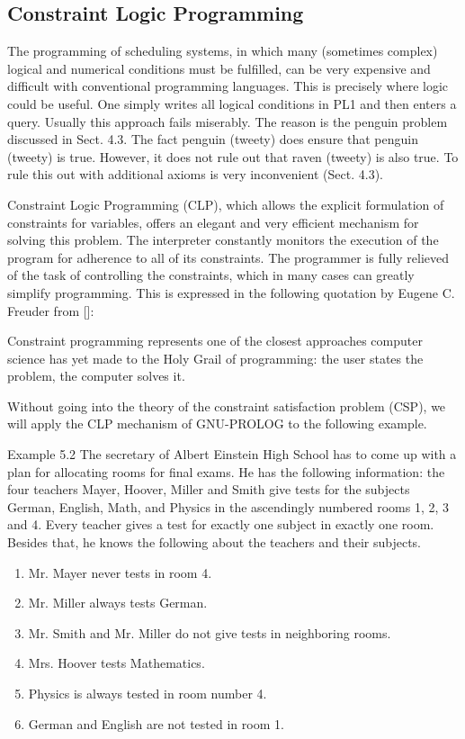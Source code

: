 \documentclass[10pt]{book}
\begin{document}
\subsection{Constraint Logic Programming}
The programming of scheduling systems, in which many (sometimes complex) logical and numerical conditions must be fulfilled, can be very expensive and difficult with conventional programming languages. This is precisely where logic could be useful. One simply writes all logical conditions in PL1 and then enters a query. Usually this approach fails miserably. The reason is the penguin problem discussed in Sect. 4.3. The fact penguin (tweety) does ensure that penguin (tweety) is true. However, it does not rule out that raven (tweety) is also true. To rule this out with additional axioms is very inconvenient (Sect. 4.3).

Constraint Logic Programming (CLP), which allows the explicit formulation of constraints for variables, offers an elegant and very efficient mechanism for solving this problem. The interpreter constantly monitors the execution of the program for adherence to all of its constraints. The programmer is fully relieved of the task of controlling the constraints, which in many cases can greatly simplify programming. This is expressed in the following quotation by Eugene C. Freuder from [\cite{freuder1997holyGrail}]:
\begin{displayquote}
Constraint programming represents one of the closest approaches computer science has yet made to the Holy Grail of programming: the user states the problem, the computer solves it.
\end{displayquote}

Without going into the theory of the constraint satisfaction problem (CSP), we will apply the CLP mechanism of GNU-PROLOG to the following example.

Example 5.2 The secretary of Albert Einstein High School has to come up with a plan for allocating rooms for final exams. He has the following information: the four teachers Mayer, Hoover, Miller and Smith give tests for the subjects German, English, Math, and Physics in the ascendingly numbered rooms 1, 2, 3 and 4. Every teacher gives a test for exactly one subject in exactly one room. Besides that, he knows the following about the teachers and their subjects.

\begin{enumerate}
  \item Mr. Mayer never tests in room 4.
  \item Mr. Miller always tests German.
  \item Mr. Smith and Mr. Miller do not give tests in neighboring rooms.
  \item Mrs. Hoover tests Mathematics.
  \item Physics is always tested in room number 4.
  \item German and English are not tested in room 1.
\end{enumerate}
\end{document}

